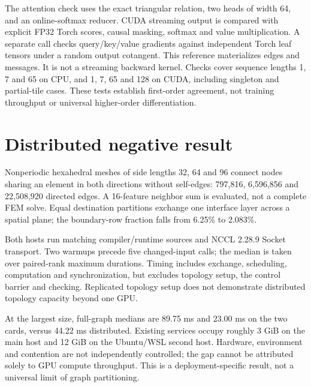 The attention check uses the exact triangular relation, two heads of width 64,
and an online-softmax reducer. CUDA streaming output is compared with explicit
FP32 Torch scores, causal masking, softmax and value multiplication. A separate
 call checks query/key/value gradients against independent
Torch leaf tensors under a random output cotangent. This reference materializes
edges and messages. It is not a streaming backward kernel. Checks cover sequence
lengths 1, 7 and 65 on CPU, and 1, 7, 65 and 128 on CUDA, including singleton
and partial-tile cases. These tests establish first-order agreement, not
training throughput or universal higher-order differentiation.

\section{Distributed negative result}
\label{ws:distributed}
Nonperiodic hexahedral meshes of side lengths 32, 64 and 96 connect nodes
sharing an element in both directions without self-edges: 797,816, 6,596,856
and 22,508,920 directed edges. A 16-feature neighbor sum is evaluated, not a
complete FEM solve. Equal destination partitions exchange one interface layer
across a spatial plane; the boundary-row fraction falls from 6.25\% to 2.083\%.

Both hosts run matching compiler/runtime sources and NCCL 2.28.9 Socket
transport. Two warmups precede five changed-input calls; the median is taken
over paired-rank maximum durations. Timing includes exchange, scheduling,
computation and synchronization, but excludes topology setup, the control
barrier and checking. Replicated topology setup does not demonstrate
distributed topology capacity beyond one GPU.

At the largest size, full-graph medians are 89.75 ms and 23.00 ms on the two
cards, versus 44.22 ms distributed. Existing services occupy roughly 3 GiB on
the main host and 12 GiB on the Ubuntu/WSL second host. Hardware, environment
and contention are not independently controlled; the gap cannot be attributed
solely to GPU compute throughput. This is a deployment-specific result, not a
universal limit of graph partitioning.
